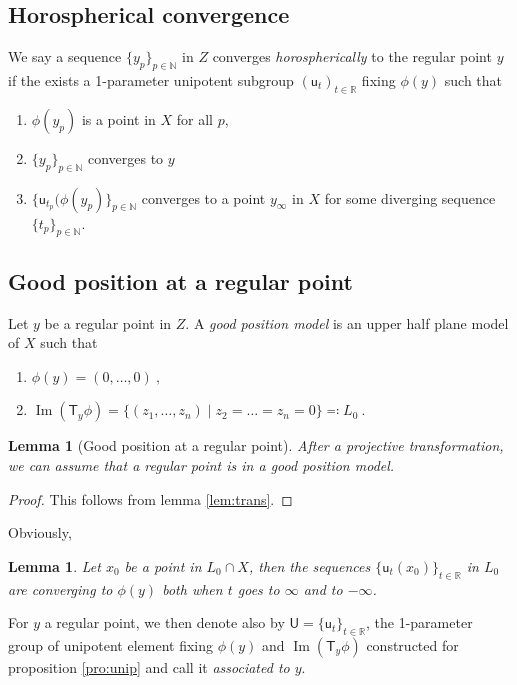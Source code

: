 \documentclass[12pt,reqno]{amsart}
\newtheorem{lemma}[theorem]{Lemma}
\newcommand{\T}{\ms T}
\newcommand{\ms}{\mathsf}
\newcommand{\eqdef}{\eqqcolon}
\newcommand{\im}{\operatorname{Im}}
\newcommand{\uu}{\mathsf u}
\newcommand{\mU}{\mathsf U}
\newcommand{\seq}[1]{ \{{#1}_p\}_{p\in\mathbb N}}
\newcommand{\seqp}[1]{ \{{#1}\}_{p\in\mathbb N}}
\newcommand{\seqt}[1]{ \{{#1}\}_{t\in\mathbb R}}
\begin{document}
\subsection{Horospherical convergence}
We say a sequence $\seq{y}$ in $Z$ converges {\em horospherically} to the regular point $y$ if the exists a 1-parameter unipotent subgroup $(\uu_t)_{t\in\mathbb R}$ fixing $\phi(y)$ such that 
\begin{enumerate}
	\item $\phi(y_p)$ is a point in $X$ for all $p$,
	\item $\seq{y}$ converges to $y$
	\item $\seqp{\uu_{t_p}(\phi(y_p)}$ converges to a point $y_\infty$ in $X$ for some diverging sequence $\seq{t}$.
\end{enumerate}

\subsection{Good position at a regular point}
Let $y$ be a regular point in $Z$.   
A {\em good position model} is an upper half plane model of $X$ such that   
\begin{enumerate}
	\item $\phi(y)=(0,\ldots,0)\ ,$
	\item $\im (\T_{y}\phi)= 
	\{(z_1,\ldots,z_n)\mid z_2=\ldots=z_n=0\}\eqdef L_0\ .$
	 \end{enumerate}

\begin{lemma}[\sc Good position at a regular point]\label{lem:gp}
After a projective transformation, we can assume that a regular point is in a good position model.
\end{lemma}
\begin{proof}
This follows from lemma \ref{lem:trans}.	
\end{proof}

Obviously,
\begin{lemma}
Let $x_0$ be a point in $L_0\cap X$, then the sequences $\seqt{\uu_t(x_0)}$ in  $L_0$ are converging to $\phi(y)$ both when $t$ goes to $\infty$ and to $-\infty$.	
\end{lemma}

For $y$ a regular point, 
we then  denote also by $\mU=\{\uu_t\}_{t\in\mathbb R}$, the 1-parameter group of unipotent element fixing $\phi(y)$ and $\im(\T_y\phi)$ constructed for proposition \ref{pro:unip} and call it {\em associated to $y$}.
\end{document}
